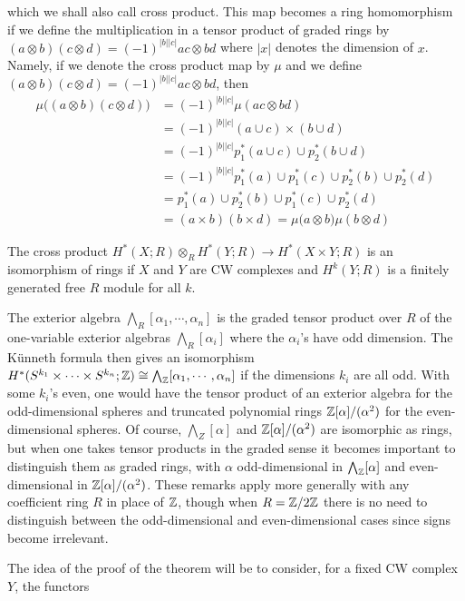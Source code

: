 which we shall also call cross product. This map becomes a ring homomorphism if
we define the multiplication in a tensor product of graded rings by $(a\otimes b)(c\otimes d)=(-1)^{|b||c|}ac\otimes bd$ where $|x|$ denotes the dimension of $x$. Namely, if we denote the cross product map by $\mu$ and we define $(a\otimes b)(c\otimes  d)=(-1)^{|b||c|}ac\otimes bd$, then
\begin{align*}
\mu\big((a\otimes b)(c\otimes d)\big)&=(-1)^{|b||c|}\mu(ac\otimes bd)\\
&=(-1)^{|b||c|}(a\cup c)\times(b\cup d)\\
&=(-1)^{|b||c|}p_1^*(a\cup c)\cup p_2^*(b\cup d)\\
&=(-1)^{|b||c|}p_1^*(a)\cup p_1^*(c)\cup p_2^*(b)\cup p_2^*(d)\\
&=p_1^*(a)\cup p_2^*(b)\cup p_1^*(c)\cup p_2^*(d)\\
&=(a\times b)(b\times d)=\mu\big(a\otimes b\big)\mu(b\otimes d)
\end{align*}
\begin{theorem}\label{homology prod}
The cross product $H^*(X;R)\otimes_RH^*(Y;R)\to H^*(X\times Y;R)$ is an isomorphism of rings if $X$ and $Y$ are CW complexes and $H^k(Y;R)$ is a finitely generated free $R$ module for all $k$.
\end{theorem}
\begin{example}
The exterior algebra $\bigwedge_R[\alpha_1,\cdots,\alpha_n]$ is the graded tensor product over $R$ of the one-variable exterior algebras $\bigwedge_R[\alpha_i]$ where the $\alpha_i$'s have odd dimension. The K\"unneth formula then gives an isomorphism $H^*(S^{k_1}\times\cdots\times S^{k_n};\mathbb{Z})\cong\bigwedge_{\mathbb{Z}}[\alpha_1,\cdots,\alpha_n]$ if the dimensions $k_i$ are all odd. With some $k_i$'s even, one would have the tensor product of an exterior algebra for the odd-dimensional spheres and truncated polynomial rings $\mathbb{Z}[\alpha]/(\alpha^2)$ for the even-dimensional spheres. Of course, $\bigwedge_Z[\alpha]$ and $\mathbb{Z}[\alpha]/(\alpha^2)$ are isomorphic as rings, but when one takes tensor products in the graded sense it becomes important to distinguish them as graded rings, with $\alpha$ odd-dimensional in $\bigwedge_{\mathbb{Z}}[\alpha]$ and even-dimensional in $\mathbb{Z}[\alpha]/(\alpha^2)$. These remarks apply more generally with any coefficient ring $R$ in place of $\mathbb{Z}$, though when $R=\mathbb{Z}/2\mathbb{Z}$ there is no need to distinguish between the odd-dimensional and even-dimensional cases since signs become irrelevant.
\end{example}
The idea of the proof of the theorem will be to consider, for a fixed CW complex $Y$, the functors
